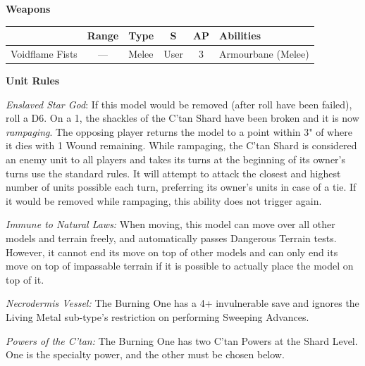 \begin{minipage}[t]{0.72\textwidth}
	\vspace*{2em}
	\textbf{Weapons}
	
	\begin{tabular}{L{90 pt} c C{40pt} *{2}{c} >{\raggedright\arraybackslash}p{130pt}}
		& Range & Type & S & AP & Abilities \\
		\hline
		Voidflame Fists & — & Melee & User & 3 & Armourbane (Melee) \\
	\end{tabular}
	
	\vspace*{2em}
	\textbf{Unit Rules}
	
	\textit{Enslaved Star God}: If this model would be removed (after  roll have been failed), roll a D6. On a 1, the shackles of the C'tan Shard have been broken and it is now \textit{rampaging}. The opposing player returns the model to a point within 3" of where it dies with 1 Wound remaining. While rampaging, the C'tan Shard is considered an enemy unit to all players and takes its turns at the beginning of its owner's turns use the standard rules. It will attempt to attack the closest and highest number of units possible each turn, preferring its owner's units in case of a tie. If it would be removed while rampaging, this ability does not trigger again.
		
	\textit{Immune to Natural Laws:} When moving, this model can move over all other models and terrain freely, and automatically passes Dangerous Terrain tests. However, it cannot end its move on top of other models and can only end its move on top of impassable terrain if it is possible to actually place the model on top of it.
	
	\textit{Necrodermis Vessel:} The Burning One has a 4+ invulnerable save and ignores the Living Metal sub-type's restriction on performing Sweeping Advances.
	
	\textit{Powers of the C'tan:} The Burning One has two C'tan Powers at the Shard Level. One is the  specialty power, and the other must be chosen below.
	

\end{minipage}
